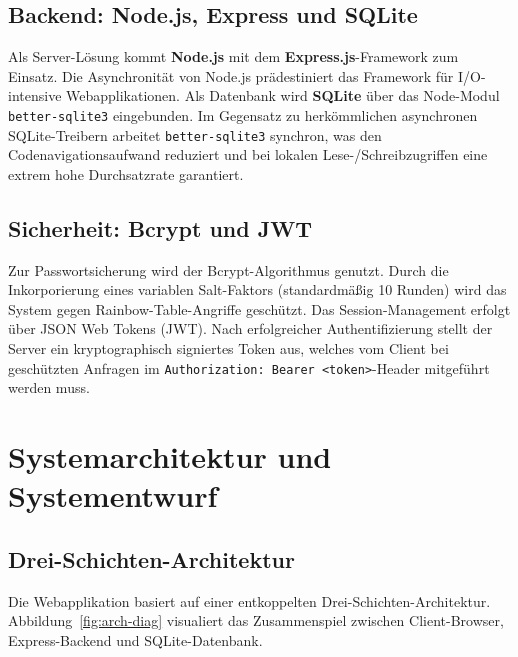 \documentclass[12pt,a4paper]{article}
\begin{document}
\subsection{Backend: Node.js, Express und SQLite}
Als Server-Lösung kommt \textbf{Node.js} mit dem \textbf{Express.js}-Framework zum Einsatz. Die Asynchronität von Node.js prädestiniert das Framework für I/O-intensive Webapplikationen. Als Datenbank wird \textbf{SQLite} über das Node-Modul \texttt{better-sqlite3} eingebunden. Im Gegensatz zu herkömmlichen asynchronen SQLite-Treibern arbeitet \texttt{better-sqlite3} synchron, was den Codenavigationsaufwand reduziert und bei lokalen Lese-/Schreibzugriffen eine extrem hohe Durchsatzrate garantiert.

\subsection{Sicherheit: Bcrypt und JWT}
Zur Passwortsicherung wird der Bcrypt-Algorithmus genutzt. Durch die Inkorporierung eines variablen Salt-Faktors (standardmäßig 10 Runden) wird das System gegen Rainbow-Table-Angriffe geschützt. Das Session-Management erfolgt über JSON Web Tokens (JWT). Nach erfolgreicher Authentifizierung stellt der Server ein kryptographisch signiertes Token aus, welches vom Client bei geschützten Anfragen im \texttt{Authorization: Bearer <token>}-Header mitgeführt werden muss.

\section{Systemarchitektur und Systementwurf}

\subsection{Drei-Schichten-Architektur}
Die Webapplikation basiert auf einer entkoppelten Drei-Schichten-Architektur. Abbildung~\ref{fig:arch-diag} visualiert das Zusammenspiel zwischen Client-Browser, Express-Backend und SQLite-Datenbank.
\end{document}
